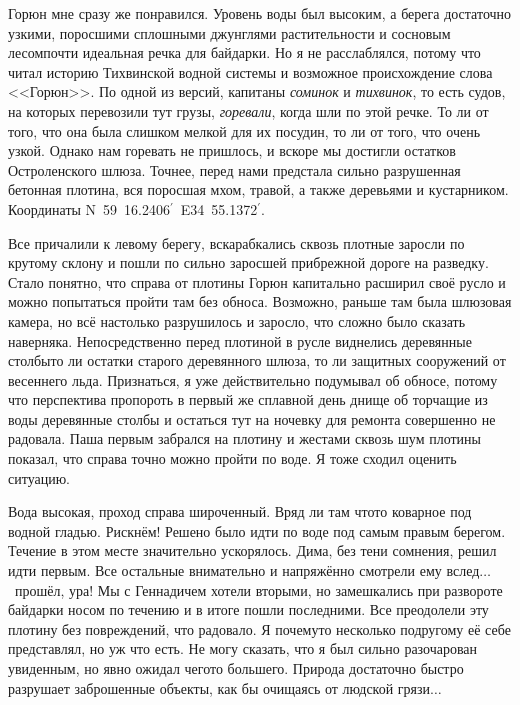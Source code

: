 Горюн мне сразу же понравился. Уровень воды был высоким, а берега достаточно узкими, поросшими сплошными джунглями растительности и сосновым лесом\mdash почти идеальная речка для байдарки. Но я не расслаблялся, потому что читал историю Тихвинской водной системы и возможное происхождение слова <<Горюн>>. По одной из версий, капитаны \textit{соминок} и \textit{тихвинок}, то есть судов, на которых перевозили тут грузы, \textit{горевали}, когда шли по этой речке. То ли от того, что она была слишком мелкой для их посудин, то ли от того, что очень узкой. Однако нам горевать не пришлось, и вскоре мы достигли остатков Остроленского шлюза. Точнее, перед нами предстала сильно разрушенная бетонная плотина, вся поросшая мхом, травой, а также деревьями и кустарником. Координаты N~59\degree~16.2406$^\prime$~E34\degree~55.1372$^\prime$. 

Все причалили к левому берегу, вскарабкались сквозь плотные заросли по крутому склону и пошли по сильно заросшей прибрежной дороге на разведку. Стало понятно, что справа от плотины Горюн капитально расширил своё русло и можно попытаться пройти там без обноса. Возможно, раньше там была шлюзовая камера, но всё настолько разрушилось и заросло, что сложно было сказать наверняка. Непосредственно перед плотиной в русле виднелись деревянные столбы\mdash то ли остатки старого деревянного шлюза, то ли защитных сооружений от весеннего льда. Признаться, я уже действительно подумывал об обносе, потому что перспектива пропороть в первый же сплавной день днище об торчащие из воды деревянные столбы и остаться тут на ночевку для ремонта совершенно не радовала. Паша первым забрался на плотину и жестами сквозь шум плотины показал, что справа точно можно пройти по воде. Я тоже сходил оценить ситуацию. 

Вода высокая, проход справа широченный. Вряд ли там что\sdash то коварное под водной гладью. Рискнём! Решено было идти по воде под самым правым берегом. Течение в этом месте значительно ускорялось. Дима, без тени сомнения, решил идти первым. Все остальные внимательно и напряжённо смотрели ему вслед$\ldots$~прошёл, ура! Мы с Геннадичем хотели вторыми, но замешкались при развороте байдарки носом по течению и в итоге пошли последними. Все преодолели эту плотину без повреждений, что радовало. Я почему\sdash то несколько по\sdash другому её себе представлял, но уж что есть. Не могу сказать, что я был сильно разочарован увиденным, но явно ожидал чего\sdash то большего. Природа достаточно быстро разрушает заброшенные объекты, как бы очищаясь от людской грязи$\ldots$

